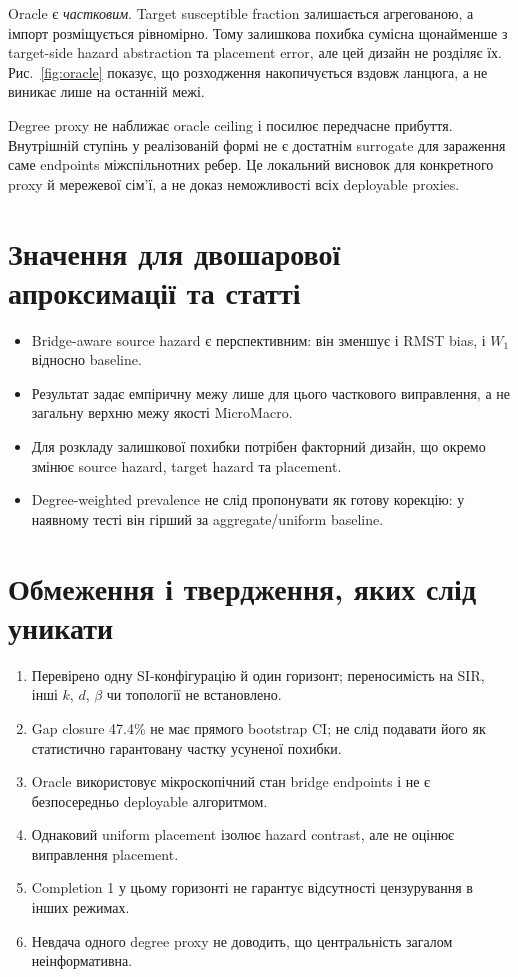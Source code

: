 \documentclass[11pt,a4paper]{article}
\begin{document}
Oracle є \emph{частковим}. Target susceptible fraction залишається агрегованою,
а імпорт розміщується рівномірно. Тому залишкова похибка сумісна щонайменше з
target-side hazard abstraction та placement error, але цей дизайн не розділяє
їх. Рис.~\ref{fig:oracle} показує, що розходження накопичується вздовж ланцюга,
а не виникає лише на останній межі.

Degree proxy не наближає oracle ceiling і посилює передчасне прибуття.
Внутрішній ступінь у реалізованій формі не є достатнім surrogate для зараження
саме endpoints міжспільнотних ребер. Це локальний висновок для конкретного
proxy й мережевої сім'ї, а не доказ неможливості всіх deployable proxies.

\section{Значення для двошарової апроксимації та статті}\label{sec:paper}

\begin{itemize}
  \item Bridge-aware source hazard є перспективним: він зменшує і RMST bias,
  і $W_1$ відносно baseline.
  \item Результат задає емпіричну межу лише для цього часткового виправлення,
  а не загальну верхню межу якості MicroMacro.
  \item Для розкладу залишкової похибки потрібен факторний дизайн, що окремо
  змінює source hazard, target hazard та placement.
  \item Degree-weighted prevalence не слід пропонувати як готову корекцію:
  у наявному тесті він гірший за aggregate/uniform baseline.
\end{itemize}

\section{Обмеження і твердження, яких слід уникати}\label{sec:limits}

\begin{enumerate}
  \item Перевірено одну SI-конфігурацію й один горизонт; переносимість на SIR,
  інші $k$, $d$, $\beta$ чи топології не встановлено.
  \item Gap closure 47.4\% не має прямого bootstrap CI; не слід подавати його
  як статистично гарантовану частку усуненої похибки.
  \item Oracle використовує мікроскопічний стан bridge endpoints і не є
  безпосередньо deployable алгоритмом.
  \item Однаковий uniform placement ізолює hazard contrast, але не оцінює
  виправлення placement.
  \item Completion 1 у цьому горизонті не гарантує відсутності цензурування
  в інших режимах.
  \item Невдача одного degree proxy не доводить, що центральність загалом
  неінформативна.
\end{enumerate}
\end{document}
